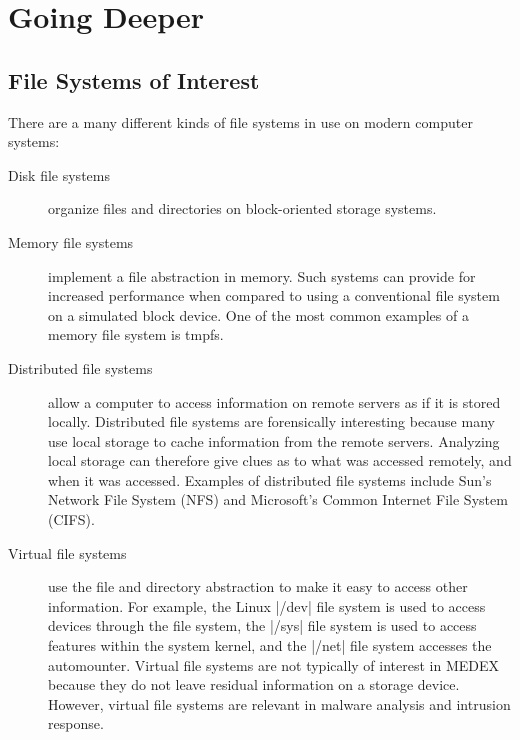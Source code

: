 \section{Going Deeper}
\subsection{File Systems of Interest}
There are a many different kinds of file systems in use on
modern computer systems:
\begin{description}
\item[Disk file systems] organize files and directories on
  block-oriented storage systems. 
\item[Memory file systems] implement a file abstraction in
  memory. Such systems can provide for increased performance when
  compared to using a conventional file system on a simulated block
  device. One of the most common examples of a memory file system is tmpfs\cite{Snyder90tmpfs:a}.
\item[Distributed file systems] allow a computer to access
  information on remote servers as if it is stored
  locally. Distributed file systems are forensically interesting
  because many use local storage to cache information from the remote
  servers. Analyzing local storage can therefore give clues as to what
  was accessed remotely, and when it was accessed. Examples of
  distributed file systems include Sun's Network File System
  (NFS)\cite{Sandberg85designand,Pawlowski00thenfs} and Microsoft's
  Common Internet File System (CIFS)\cite{ms-cifs}.
\item[Virtual file systems] use the file and directory abstraction to
  make it easy to access other information. For example, the Linux
  |/dev| file system is used to access devices through the file
  system, the |/sys| file system is used to access features within
  the system kernel, and the |/net| file system accesses the
  automounter. Virtual file systems are not typically of interest in
  MEDEX because they do not leave residual information on a storage
  device. However, virtual file systems are relevant in malware
  analysis and intrusion response.
\end{description}

